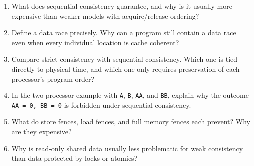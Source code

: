 \begin{enumerate}
\begin{verbatim}
Thread B:  B1: tB = M[0x3004]
           B2: tB = tB + 9
           B3: M[0x3008] = tB
    \end{verbatim}
    Assume the initial values are $M[0x3008]=20$ and $M[0x3004]=10$.
    If the actual-time order is $A1,B1,A2,B2,A3,B3$, give the final values under strict consistency.
    Then give two different legal interleavings under sequential consistency that do \emph{not} follow that actual-time order, and state the final memory values in each case.
    \item What does sequential consistency guarantee, and why is it usually more expensive than weaker models with acquire/release ordering?
    \item Define a data race precisely.
    Why can a program still contain a data race even when every individual location is cache coherent?
    \item Compare strict consistency with sequential consistency.
    Which one is tied directly to physical time, and which one only requires preservation of each processor's program order?
    \item In the two-processor example with \texttt{A}, \texttt{B}, \texttt{AA}, and \texttt{BB}, explain why the outcome \texttt{AA = 0, BB = 0} is forbidden under sequential consistency.
    \item What do store fences, load fences, and full memory fences each prevent?
    Why are they expensive?
    \item Why is read-only shared data usually less problematic for weak consistency than data protected by locks or atomics?
\end{enumerate}
